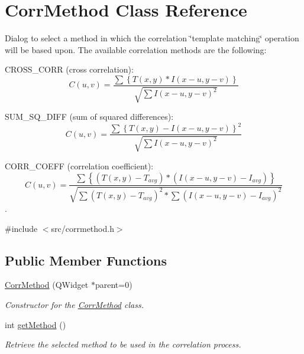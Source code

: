 \hypertarget{classCorrMethod}{
\section{CorrMethod Class Reference}
\label{classCorrMethod}
}


Dialog to select a method in which the correlation \char`\"{}template matching\char`\"{} operation will be based upon. The available correlation methods are the following:
\begin{DoxyItemize}
\item CROSS\_\-CORR (cross correlation): \[ C(u,v) = \frac {\sum{\left\{T(x,y) * I(x-u,y-v)\right\}}} {\sqrt{ \sum{I(x-u,y-v)^2}}} \]
\item SUM\_\-SQ\_\-DIFF (sum of squared differences): \[ C(u,v) = \frac {\sum{\left\{T(x,y)-I(x-u,y-v)\right\}^2}} {\sqrt{\sum{I(x-u,y-v)^2}}} \]
\item CORR\_\-COEFF (correlation coefficient): \[ C(u,v) = \frac {\sum{\left\{(T(x,y)-T_{avg}) * (I(x-u,y-v)-I_{avg})\right\}}} {\sqrt{\sum{(T(x,y)-T_{avg})^2} * \sum{(I(x-u,y-v)-I_{avg})^2}}} \]. 
\end{DoxyItemize} 


{\ttfamily \#include $<$src/corrmethod.h$>$}\subsection*{Public Member Functions}
\begin{DoxyCompactItemize}
\item 
\hypertarget{classCorrMethod_abdc14398267291249d40158e133cf68b}{
\hyperlink{classCorrMethod_abdc14398267291249d40158e133cf68b}{CorrMethod} (QWidget $\ast$parent=0)}
\label{classCorrMethod_abdc14398267291249d40158e133cf68b}

\begin{DoxyCompactList}\small\item\em Constructor for the \hyperlink{classCorrMethod}{CorrMethod} class. \item\end{DoxyCompactList}\item 
int \hyperlink{classCorrMethod_a3eeafdd901560c1fa92be75d4ed58872}{getMethod} ()
\begin{DoxyCompactList}\small\item\em Retrieve the selected method to be used in the correlation process. \item\end{DoxyCompactList}\end{DoxyCompactItemize}
